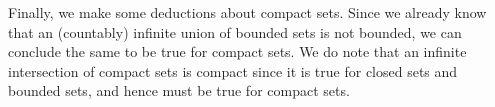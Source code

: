 \documentclass[10pt]{article}
\begin{document}
Finally, we make some deductions about compact sets. Since we already know that an (countably) infinite union of bounded sets is not bounded, we can conclude the same to be true for compact sets. We do note that an infinite intersection of compact sets is compact since it is true for closed sets and bounded sets, and hence must be true for compact sets.
\end{document}
